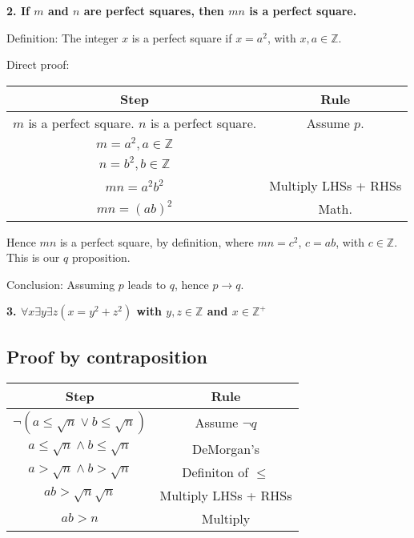 \documentclass[english,openany]{book}
\begin{document}
	\textbf{2. If $m$ and $n$ are perfect squares, then $mn$ is a perfect square.}

	Definition: The integer $x$ is a perfect square if $x = a^2$, with $x, a \in \mathbb Z$.

	Direct proof:

	\begin{tabular}{c|c}
		Step&Rule\\
		\hline
		$m$ is a perfect square. $n$ is a perfect square. &Assume $p$.\\

		$m = a^2, a \in \mathbb Z$&\\

		$n = b^2, b \in \mathbb Z$&\\

		$mn = a^2 b^2$ &Multiply LHSs + RHSs\\

		$mn = (ab)^2$ &Math.\\
	\end{tabular}

	Hence $mn$ is a perfect square, by definition, where $mn = c^2$, $c=ab$, with $c \in \mathbb Z$. This is our $q$ proposition.

	Conclusion: Assuming $p$ leads to $q$, hence $p \rightarrow q$.\newline

	\textbf{3. $\forall x \exists y \exists z (x=y^2 + z^2)$ with $y,z \in \mathbb Z$ and $x \in \mathbb Z^+$}

	\subsection{Proof by contraposition}

	\begin{tabular}{c|c}
		Step&Rule\\
		\hline
		$\neg(a \leq \sqrt{n} \lor b \leq \sqrt{n})$ & Assume $\neg q$\\

		$a \leq \sqrt{n} \wedge b \leq \sqrt{n}$ & DeMorgan's\\

		$a > \sqrt{n} \wedge b > \sqrt{n}$ & Definiton of $\leq$\\

		$ab > \sqrt{n}\sqrt{n}$ & Multiply LHSs + RHSs\\

		$ab > n$ & Multiply\\
	\end{tabular}
\end{document}
